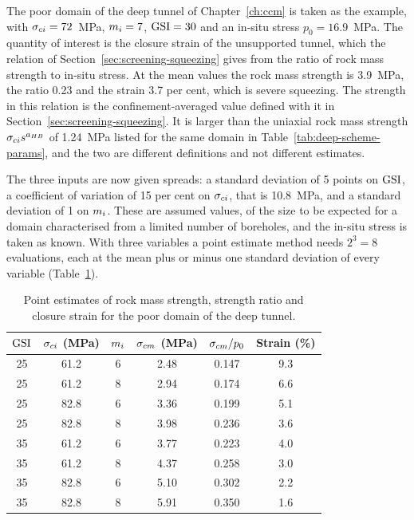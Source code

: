 The poor domain of the deep tunnel of Chapter~\ref{ch:ccm} is taken as the
example, with $\sigma_{ci} = 72$~MPa, $m_i = 7$, $\mathrm{GSI} = 30$ and an in-situ stress
$p_0 = 16.9$~MPa. The quantity of interest is the closure strain of the
unsupported tunnel, which the relation of
Section~\ref{sec:screening-squeezing} gives from the ratio of rock mass
strength to in-situ stress. At the mean values the rock mass strength is
3.9~MPa, the ratio 0.23 and the strain 3.7 per cent, which is severe
squeezing. The strength in this relation is the confinement-averaged value
defined with it in Section~\ref{sec:screening-squeezing}. It is larger than
the uniaxial rock mass strength $\sigma_{ci} s^{a_{HB}}$ of 1.24~MPa listed for the
same domain in Table~\ref{tab:deep-scheme-params}, and the two are different
definitions and not different estimates.

The three inputs are now given spreads: a standard deviation of 5 points on
$\mathrm{GSI}$, a coefficient of variation of 15 per cent on $\sigma_{ci}$, that is
10.8~MPa, and a standard deviation of 1 on $m_i$. These are assumed values,
of the size to be expected for a domain characterised from a limited number
of boreholes, and the in-situ stress is taken as known. With three variables
a point estimate method needs $2^3 = 8$ evaluations, each at the mean plus
or minus one standard deviation of every variable
(Table~\ref{tab:pem-squeezing}).

\begin{table}[htbp]
\caption{Point estimates of rock mass strength, strength ratio and closure
strain for the poor domain of the deep tunnel.}
\label{tab:pem-squeezing}
\centering
\small
\begin{tabular}{c c c c c c}
\toprule
$\mathrm{GSI}$ & $\sigma_{ci}$ (MPa) & $m_i$ & $\sigma_{cm}$ (MPa) & $\sigma_{cm}/p_0$ & Strain (\%) \\
\midrule
25 & 61.2 & 6 & 2.48 & 0.147 & 9.3 \\
25 & 61.2 & 8 & 2.94 & 0.174 & 6.6 \\
25 & 82.8 & 6 & 3.36 & 0.199 & 5.1 \\
25 & 82.8 & 8 & 3.98 & 0.236 & 3.6 \\
35 & 61.2 & 6 & 3.77 & 0.223 & 4.0 \\
35 & 61.2 & 8 & 4.37 & 0.258 & 3.0 \\
35 & 82.8 & 6 & 5.10 & 0.302 & 2.2 \\
35 & 82.8 & 8 & 5.91 & 0.350 & 1.6 \\
\bottomrule
\end{tabular}
\end{table}

